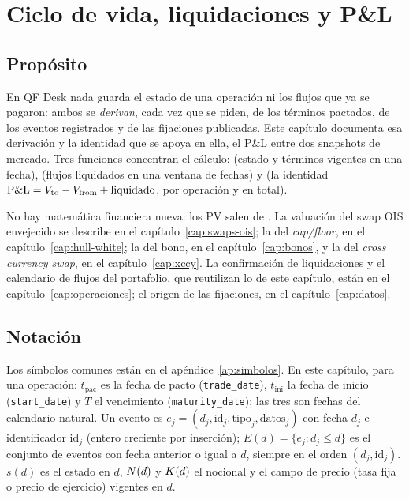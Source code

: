 \chapter{Ciclo de vida, liquidaciones y P\&L}\label{cap:ciclo-vida}

\section{Propósito}\label{sec:cap08-proposito}

En QF Desk nada guarda el estado de una operación ni los flujos que ya se pagaron: ambos se \emph{derivan}, cada vez que se piden, de los términos pactados, de los eventos registrados y de las fijaciones publicadas. Este capítulo documenta esa derivación y la identidad que se apoya en ella, el P\&L entre dos snapshots de mercado. Tres funciones concentran el cálculo:  (estado y términos vigentes en una fecha),  (flujos liquidados en una ventana de fechas) y  (la identidad $\mathrm{P\&L} = V_{\mathrm{to}} - V_{\mathrm{from}} + \text{liquidado}$, por operación y en total).

No hay matemática financiera nueva: los PV salen de . La valuación del swap OIS envejecido se describe en el capítulo~\ref{cap:swaps-ois}; la del \emph{cap/floor}, en el capítulo~\ref{cap:hull-white}; la del bono, en el capítulo~\ref{cap:bonos}, y la del \emph{cross currency swap}, en el capítulo~\ref{cap:xccy}. La confirmación de liquidaciones y el calendario de flujos del portafolio, que reutilizan lo de este capítulo, están en el capítulo~\ref{cap:operaciones}; el origen de las fijaciones, en el capítulo~\ref{cap:datos}.

\section{Notación}\label{sec:cap08-notacion}

Los símbolos comunes están en el apéndice~\ref{ap:simbolos}. En este capítulo, para una operación: $t_{\mathrm{pac}}$ es la fecha de pacto (\texttt{trade\_date}), $t_{\mathrm{ini}}$ la fecha de inicio (\texttt{start\_date}) y $T$ el vencimiento (\texttt{maturity\_date}); las tres son fechas del calendario natural. Un evento es $e_j = (d_j, \mathrm{id}_j, \mathrm{tipo}_j, \mathrm{datos}_j)$ con fecha $d_j$ e identificador $\mathrm{id}_j$ (entero creciente por inserción); $E(d) = \{e_j : d_j \le d\}$ es el conjunto de eventos con fecha anterior o igual a $d$, siempre en el orden $(d_j, \mathrm{id}_j)$. $s(d)$ es el estado en $d$, $N(d)$ y $K(d)$ el nocional y el campo de precio (tasa fija o precio de ejercicio) vigentes en $d$.

